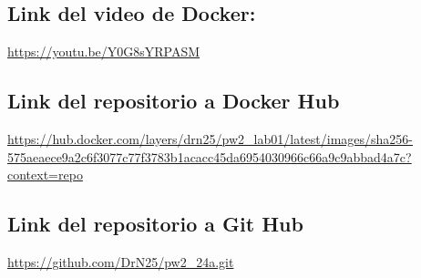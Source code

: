 \documentclass{article}
\begin{document}
\subsection{Link del video de Docker:}
\url{https://youtu.be/Y0G8sYRPASM}

\subsection{Link del repositorio a Docker Hub}
\url{https://hub.docker.com/layers/drn25/pw2_lab01/latest/images/sha256-575aeaece9a2c6f3077c77f3783b1acacc45da6954030966c66a9c9abbad4a7c?context=repo}

\subsection{Link del repositorio a Git Hub}
\url{https://github.com/DrN25/pw2_24a.git}
\end{document}
